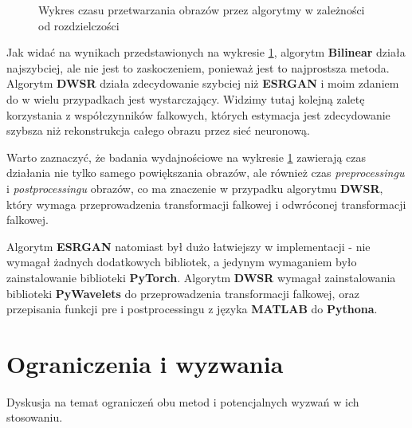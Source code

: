 \begin{figure}[H]
    \centering

    \caption{Wykres czasu przetwarzania obrazów przez algorytmy w zależności od rozdzielczości}
    \label{fig:time_chart}
\end{figure}

Jak widać na wynikach przedstawionych na wykresie \ref{fig:time_chart}, algorytm \textbf{Bilinear} działa najszybciej, ale nie jest to zaskoczeniem, ponieważ jest to najprostsza metoda. Algorytm \textbf{DWSR} działa zdecydowanie szybciej niż \textbf{ESRGAN} i moim zdaniem do w wielu przypadkach jest wystarczający. Widzimy tutaj kolejną zaletę korzystania z współczynników falkowych, których estymacja jest zdecydowanie szybsza niż rekonstrukcja całego obrazu przez sieć neuronową.

Warto zaznaczyć, że badania wydajnościowe na wykresie \ref{fig:time_chart} zawierają czas działania nie tylko samego powiększania obrazów, ale również czas \textit{preprocessingu} i \textit{postprocessingu} obrazów, co ma znaczenie w przypadku algorytmu \textbf{DWSR}, który wymaga przeprowadzenia transformacji falkowej i odwróconej transformacji falkowej.

Algorytm \textbf{ESRGAN} natomiast był dużo łatwiejszy w implementacji - nie wymagał żadnych dodatkowych bibliotek, a jedynym wymaganiem było zainstalowanie biblioteki \textbf{PyTorch}. Algorytm \textbf{DWSR} wymagał zainstalowania biblioteki \textbf{PyWavelets} do przeprowadzenia transformacji falkowej, oraz przepisania funkcji pre i postprocessingu z języka \textbf{MATLAB} do \textbf{Pythona}.


\section{Ograniczenia i wyzwania}


Dyskusja na temat ograniczeń obu metod i potencjalnych wyzwań w ich stosowaniu.